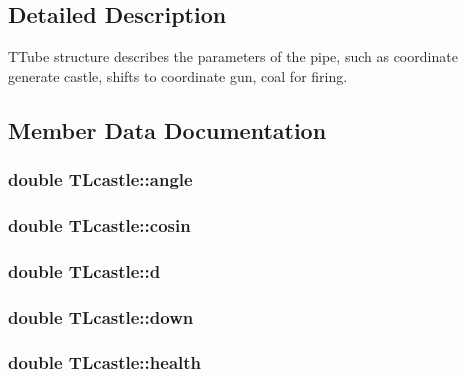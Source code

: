\subsection{Detailed Description}
T\+Tube structure describes the parameters of the pipe, such as coordinate generate castle, shifts to coordinate gun, coal for firing. 

\subsection{Member Data Documentation}
\subsubsection[{\texorpdfstring{angle}{angle}}]{\setlength{\rightskip}{0pt plus 5cm}double T\+Lcastle\+::angle}\hypertarget{struct_t_lcastle_ace89c8b9761bfbe1047c651b29f52c5a}{}\label{struct_t_lcastle_ace89c8b9761bfbe1047c651b29f52c5a}
\subsubsection[{\texorpdfstring{cosin}{cosin}}]{\setlength{\rightskip}{0pt plus 5cm}double T\+Lcastle\+::cosin}\hypertarget{struct_t_lcastle_a03a0cd8c4cfe056ffcc8400a318ff27c}{}\label{struct_t_lcastle_a03a0cd8c4cfe056ffcc8400a318ff27c}
\subsubsection[{\texorpdfstring{d}{d}}]{\setlength{\rightskip}{0pt plus 5cm}double T\+Lcastle\+::d}\hypertarget{struct_t_lcastle_a17656e3c94fa799168beb6e5e89f7d0d}{}\label{struct_t_lcastle_a17656e3c94fa799168beb6e5e89f7d0d}
\subsubsection[{\texorpdfstring{down}{down}}]{\setlength{\rightskip}{0pt plus 5cm}double T\+Lcastle\+::down}\hypertarget{struct_t_lcastle_a244b75b31e22fa23d057b35be4c31447}{}\label{struct_t_lcastle_a244b75b31e22fa23d057b35be4c31447}
\subsubsection[{\texorpdfstring{health}{health}}]{\setlength{\rightskip}{0pt plus 5cm}double T\+Lcastle\+::health}\hypertarget{struct_t_lcastle_a6682d2dcaa15a3456c64ec46e5904046}{}\label{struct_t_lcastle_a6682d2dcaa15a3456c64ec46e5904046}

